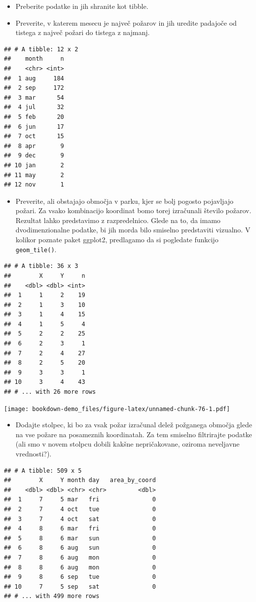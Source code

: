 \documentclass[
]{book}
\providecommand{\tightlist}{%
  \setlength{\itemsep}{0pt}\setlength{\parskip}{0pt}}
\begin{document}
\begin{enumerate}
  \begin{itemize}
  \tightlist
  \item
    Preberite podatke in jih shranite kot tibble.
  \item
    Preverite, v katerem mesecu je največ požarov in jih uredite padajoče od tistega z največ požari do tistega z najmanj.
  \end{itemize}

\begin{verbatim}
## # A tibble: 12 x 2
##    month     n
##    <chr> <int>
##  1 aug     184
##  2 sep     172
##  3 mar      54
##  4 jul      32
##  5 feb      20
##  6 jun      17
##  7 oct      15
##  8 apr       9
##  9 dec       9
## 10 jan       2
## 11 may       2
## 12 nov       1
\end{verbatim}

  \begin{itemize}
  \tightlist
  \item
    Preverite, ali obstajajo območja v parku, kjer se bolj pogosto pojavljajo požari. Za vsako kombinacijo koordinat bomo torej izračunali število požarov. Rezultat lahko predstavimo z razpredelnico. Glede na to, da imamo dvodimenzionalne podatke, bi jih morda bilo smiselno predstaviti vizualno. V kolikor poznate paket ggplot2, predlagamo da si pogledate funkcijo \texttt{geom\_tile()}.
  \end{itemize}

\begin{verbatim}
## # A tibble: 36 x 3
##        X     Y     n
##    <dbl> <dbl> <int>
##  1     1     2    19
##  2     1     3    10
##  3     1     4    15
##  4     1     5     4
##  5     2     2    25
##  6     2     3     1
##  7     2     4    27
##  8     2     5    20
##  9     3     3     1
## 10     3     4    43
## # ... with 26 more rows
\end{verbatim}

  \texttt{[image: bookdown-demo\_files/figure-latex/unnamed-chunk-76-1.pdf]}

  \begin{itemize}
  \tightlist
  \item
    Dodajte stolpec, ki bo za vsak požar izračunal delež požganega območja glede na vse požare na posameznih koordinatah. Za tem smiselno filtrirajte podatke (ali smo v novem stolpcu dobili kakšne nepričakovane, oziroma neveljavne vrednosti?).
  \end{itemize}

\begin{verbatim}
## # A tibble: 509 x 5
##        X     Y month day   area_by_coord
##    <dbl> <dbl> <chr> <chr>         <dbl>
##  1     7     5 mar   fri               0
##  2     7     4 oct   tue               0
##  3     7     4 oct   sat               0
##  4     8     6 mar   fri               0
##  5     8     6 mar   sun               0
##  6     8     6 aug   sun               0
##  7     8     6 aug   mon               0
##  8     8     6 aug   mon               0
##  9     8     6 sep   tue               0
## 10     7     5 sep   sat               0
## # ... with 499 more rows
\end{verbatim}


\end{enumerate}
\end{document}
